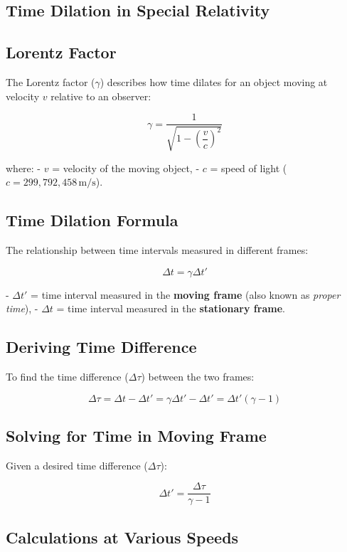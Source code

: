 \documentclass{article}
\begin{document}
\begin{multicols}{2}

\section*{Time Dilation in Special Relativity}

\subsection*{Lorentz Factor}

The Lorentz factor (\(\gamma\)) describes how time dilates for an object moving at velocity \(v\) relative to an observer:

\[
\gamma = \frac{1}{\sqrt{1 - \left( \dfrac{v}{c} \right)^2 }}
\]

where:
- \( v \) = velocity of the moving object,
- \( c \) = speed of light (\( c = 299{,}792{,}458 \, \text{m/s} \)).

\subsection*{Time Dilation Formula}

The relationship between time intervals measured in different frames:

\[
\Delta t = \gamma \Delta t'
\]

- \( \Delta t' \) = time interval measured in the \textbf{moving frame} (also known as \emph{proper time}),
- \( \Delta t \) = time interval measured in the \textbf{stationary frame}.

\subsection*{Deriving Time Difference}

To find the time difference (\( \Delta \tau \)) between the two frames:

\[
\Delta \tau = \Delta t - \Delta t' = \gamma \Delta t' - \Delta t' = \Delta t' (\gamma - 1)
\]

\subsection*{Solving for Time in Moving Frame}

Given a desired time difference (\( \Delta \tau \)):

\[
\Delta t' = \frac{\Delta \tau}{\gamma - 1}
\]

\subsection*{Calculations at Various Speeds}


\end{multicols}
\end{document}
